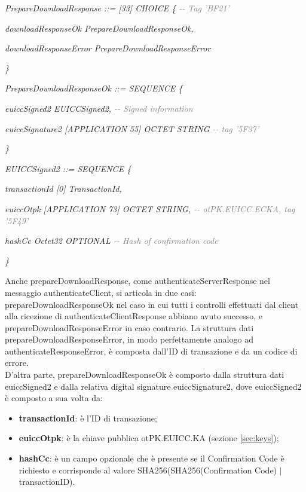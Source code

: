 \documentclass[10pt, oneside]{book}
\begin{document}
\textit{PrepareDownloadResponse ::= [33] CHOICE \{ \textcolor{gray}{{-}{-} Tag 'BF21'}}

\hspace{0.75cm} \textit{downloadResponseOk PrepareDownloadResponseOk,}

\hspace{0.75cm} \textit{downloadResponseError PrepareDownloadResponseError}

\textit{\}\\}

\textit{PrepareDownloadResponseOk ::= SEQUENCE \{}

\hspace{0.75cm} \textit{euiccSigned2 EUICCSigned2, \textcolor{gray}{{-}{-} Signed information}}

\hspace{0.75cm} \textit{euiccSignature2 [APPLICATION 55] OCTET STRING \textcolor{gray}{{-}{-} tag '5F37'}}

\textit{\}\\}

\textit{EUICCSigned2 ::= SEQUENCE \{}

\hspace{0.75cm} \textit{transactionId [0] TransactionId,}

\hspace{0.75cm} \textit{euiccOtpk [APPLICATION 73] OCTET STRING, \textcolor{gray}{{-}{-} otPK.EUICC.ECKA, tag '5F49'}}

\hspace{0.75cm} \textit{hashCc Octet32 OPTIONAL \textcolor{gray}{{-}{-} Hash of confirmation code}}

\textit{\}\\}

Anche prepareDownloadResponse, come authenticateServerResponse nel messaggio authenticateClient, si articola in due casi: prepareDownloadResponseOk nel caso in cui tutti i controlli effettuati dal client alla ricezione di authenticateClientResponse abbiano avuto successo, e prepareDownloadResponseError in caso contrario. La struttura dati prepareDownloadResponseError, in modo perfettamente analogo ad authenticateResponseError, è composta dall'ID di transazione e da un codice di errore.\\
D'altra parte, prepareDownloadResponseOk è composto dalla struttura dati euiccSigned2 e dalla relativa digital signature euiccSignature2, dove euiccSigned2 è composto a sua volta da:
\begin{itemize}
\item \textbf{transactionId}: è l'ID di transazione;
\item \textbf{euiccOtpk}: è la chiave pubblica otPK.EUICC.KA (sezione \ref{sec:keys});
\item \textbf{hashCc}: è un campo opzionale che è presente se il Confirmation Code è richiesto e corrisponde al valore SHA256(SHA256(Confirmation Code) $\vert$ transactionID).
\end{itemize}
\end{document}
